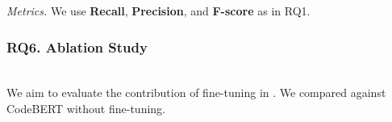 {\em Metrics.}
We use {\bf Recall}, {\bf Precision}, and {\bf F-score} as in RQ1.

\subsubsection{RQ6. Ablation Study}~\\
We aim to evaluate the contribution of fine-tuning in {\tool}. We
compared {\tool} against CodeBERT without fine-tuning.
